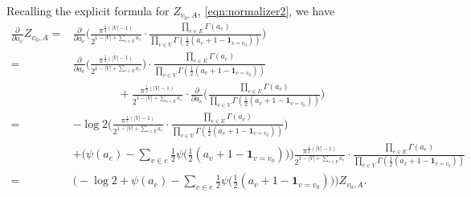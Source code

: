 \documentclass[a4paper, 11pt]{article}
\newcommand{\ind}{\mathbf{1}}
\begin{document}
Recalling the explicit formula for $Z_{v_0, A}$, \cref{eqn:normalizer2}, we have
\begin{align}
\frac{\partial}{\partial a_e}Z_{v_0, A}
=& \frac{\partial}{\partial a_e}\bigg(\frac{\pi^{\frac{1}{2}(|V|-1)}}{2^{1-|V|+\sum_{e\in E}a_e}}\cdot \frac{\prod_{e\in E}\Gamma(a_e)}{\prod_{v\in V}\Gamma(\frac{1}{2}(a_v+1-\ind_{v=v_0}))}\bigg)\nonumber \\
=& \frac{\partial}{\partial a_e}\bigg(\frac{\pi^{\frac{1}{2}(|V|-1)}}{2^{1-|V|+\sum_{e\in E}a_e}}\bigg)\cdot \frac{\prod_{e\in E}\Gamma(a_e)}{\prod_{v\in V}\Gamma(\frac{1}{2}(a_v+1-\ind_{v=v_0}))}\nonumber \\
&\qquad\qquad+ \frac{\pi^{\frac{1}{2}(|V|-1)}}{2^{1-|V|+\sum_{e\in E}a_e}}\cdot \frac{\partial}{\partial a_e}\bigg(\frac{\prod_{e\in E}\Gamma(a_e)}{\prod_{v\in V}\Gamma(\frac{1}{2}(a_v+1-\ind_{v=v_0}))}\bigg)\nonumber \\
=& -\log 2\bigg(\frac{\pi^{\frac{1}{2}(|V|-1)}}{2^{1-|V|+\sum_{e\in E}a_e}}\cdot \frac{\prod_{e\in E}\Gamma(a_e)}{\prod_{v\in V}\Gamma(\frac{1}{2}(a_v+1-\ind_{v=v_0}))}\bigg)\nonumber \\
&+ \Big(\psi(a_e)-\sum_{v\in e}\frac{1}{2}\psi\Big(\frac{1}{2}(a_v+1-\ind_{v=v_0})\Big)\Big)\frac{\pi^{\frac{1}{2}(|V|-1)}}{2^{1-|V|+\sum_{e\in E}a_e}}\cdot \frac{\prod_{e\in E}\Gamma(a_e)}{\prod_{v\in V}\Gamma(\frac{1}{2}(a_v+1-\ind_{v=v_0}))}\nonumber \\
=&\Big(-\log 2 +\psi(a_e)-\sum_{v\in e}\frac{1}{2}\psi\Big(\frac{1}{2}(a_v+1-\ind_{v=v_0})\Big)\Big)Z_{v_0, A}.\label{eqn:kl7}
\end{align}
\end{document}
